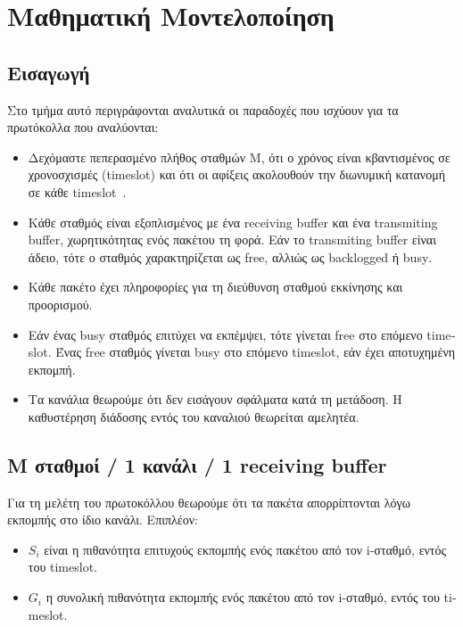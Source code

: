 \documentclass[12pt]{report}
\begin{document}
\section{Μαθηματική Μοντελοποίηση}\label{sec2.1}
\subsection{Εισαγωγή}
Στο τμήμα αυτό περιγράφονται αναλυτικά οι παραδοχές που ισχύουν για τα πρωτόκολλα που αναλύονται:
\begin{itemize}
	\item Δεχόμαστε πεπερασμένο πλήθος σταθμών \textlatin{M}, ότι ο χρόνος είναι κβαντισμένος σε χρονοσχισμές (\textlatin{timeslot}) και ότι οι αφίξεις ακολουθούν την διωνυμική κατανομή σε κάθε \textlatin{timeslot}~\cite{book:01}. 
	\item Κάθε σταθμός είναι εξοπλισμένος με ένα \textlatin{receiving buffer} και ένα \textlatin{transmiting buffer}, χωρητικότητας ενός πακέτου τη φορά. Εάν το \textlatin{transmiting buffer} είναι άδειο, τότε ο σταθμός χαρακτηρίζεται ως \textlatin{free}, αλλιώς ως \textlatin{backlogged} ή \textlatin{busy}.
	\item Κάθε πακέτο έχει πληροφορίες για τη διεύθυνση σταθμού εκκίνησης και προορισμού.
	\item Εάν ένας \textlatin{busy} σταθμός επιτύχει να εκπέμψει, τότε γίνεται \textlatin{free} στο επόμενο \textlatin{timeslot}. Ένας \textlatin{free} σταθμός γίνεται \textlatin{busy} στο επόμενο \textlatin{timeslot}, εάν έχει αποτυχημένη εκπομπή.
	\item Τα κανάλια θεωρούμε ότι δεν εισάγουν σφάλματα κατά τη μετάδοση. Η καθυστέρηση διάδοσης εντός του καναλιού θεωρείται αμελητέα.
\end{itemize}

\subsection{\textlatin{M} σταθμοί / 1 κανάλι / 1 \textlatin{receiving buffer}}
Για τη μελέτη του πρωτοκόλλου θεωρούμε ότι τα πακέτα απορρίπτονται λόγω εκπομπής στο ίδιο κανάλι. Επιπλέον:

\begin{itemize}
	\item \textlatin{\(S_i\)} είναι η πιθανότητα επιτυχούς εκπομπής ενός πακέτου από τον \textlatin{i}-σταθμό, εντός του \textlatin{timeslot}.
	\item \textlatin{\(G_i\)} η συνολική πιθανότητα εκπομπής ενός πακέτου από τον \textlatin{i}-σταθμό, εντός του \textlatin{timeslot}.
\end{itemize}
\end{document}
